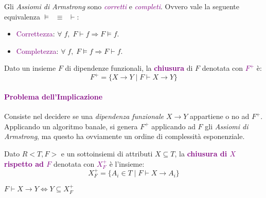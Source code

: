 \begin{theorem}
    Gli \emph{Assiomi di Armstrong} sono \emph{\textcolor{purple}{corretti}}
    e \emph{\textcolor{purple}{completi}}. Ovvero vale la seguente equivalenza
    $\models\;\;\equiv\;\;\vdash$:
    \begin{itemize}
        \item \textcolor{purple}{Correttezza}: $\forall\;f,\;F \vdash f \Rightarrow F \models f$.
        \item \textcolor{purple}{Completezza}: $\forall\;f,\;F \models f \Rightarrow F \vdash f$.
    \end{itemize}
\end{theorem}

\begin{definition}[Chiusura di $F$]
    Dato un insieme $F$ di dipendenze funzionali, la \textbf{\textcolor{purple}{chiusura}} di
    $F$ denotata con \textbf{\textcolor{purple}{$F^+$}} è:
    \begin{equation*}
        F^+ = \{X \rightarrow Y \;|\; F \vdash X \rightarrow Y\}
    \end{equation*}
\end{definition}

\paragraph{\textcolor{purple}{Problema dell'Implicazione}} Consiste nel decidere se una \emph{dipendenza funzionale}
$X \rightarrow Y$ appartiene o no ad $F^+$. Applicando un algoritmo banale, si genera $F^+$ applicando ad $F$
gli \emph{Assiomi di Armstrong}, ma questo ha ovviamente un ordine di complessità esponenziale.

\begin{definition}
    Dato $R<T, F>$ e un sottoinsiemi di attributi $X \subseteq T$, la
    \textbf{\textcolor{purple}{chiusura di $X$ rispetto ad $F$}} denotata con
    \textbf{\textcolor{purple}{$X_{F}^{+}$}} è l'insieme:
    \begin{equation*}
        X_{F}^{+} = \{A_i \in T \;|\; F \vdash X \rightarrow A_i\}
    \end{equation*}
\end{definition}

\begin{theorem}
    $F \vdash X \rightarrow Y \Leftrightarrow Y \subseteq X_{F}^{+}$
\end{theorem}

